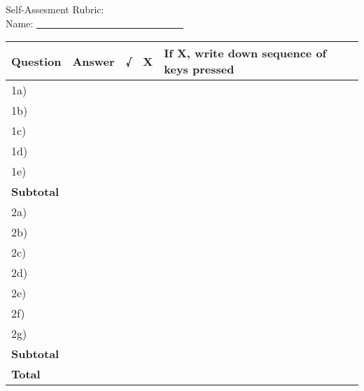Self-Assesment Rubric: \\
Name: \underline{~~~~~~~~~~~~~~~~~~~~~~~~~~~~~~}
\begin{table}[H]
 \begin{center}
  \begin{tabular}{|p{1.5cm}|p{1.5cm}|p{1cm}|p{1cm}|p{6cm}|} \hline

\textbf{Question} & \textbf{Answer} & \textbf{√} & \textbf{X} & \textbf{If X, write down sequence of keys pressed} \\ \hline
1a) &&&&\\ \hline
1b)&&&&\\ \hline
1c)&&&&\\ \hline
1d)&&&&\\ \hline
1e)&&&&\\ \hline
\textbf{Subtotal}&&&&\\ \hline
2a)&&&&\\ \hline
2b)&&&&\\ \hline
2c)&&&&\\ \hline
2d)&&&&\\ \hline
2e)&&&&\\ \hline
2f)&&&&\\ \hline
2g)&&&&\\ \hline
\textbf{Subtotal}&&&&\\ \hline
\textbf{Total}&&&& \\ \hline


   
  \end{tabular}

 \end{center}

\end{table}

